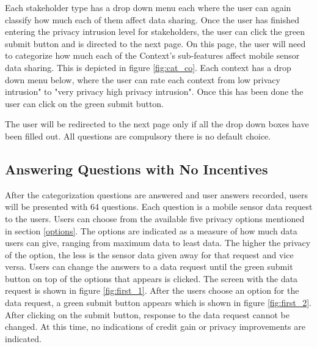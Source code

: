 Each stakeholder type has a drop
down menu each where the user can again classify how much each of them affect data sharing.
Once the user has finished entering the privacy intrusion level for stakeholders, the user can click the green submit button and is directed to the next page.
On this page, the user will need to categorize how much each of the Context's sub-features affect mobile sensor data sharing. This is depicted in figure \ref{fig:cat_co}. Each context has a drop down menu below, where the user can rate each context from low privacy intrusion" to "very privacy high privacy intrusion". Once this has been done the user can click on the green submit button.

The user will be redirected to the next page only if all the drop down boxes have been filled out. All questions are compulsory there is no default choice.

\subsection{Answering Questions with No Incentives}  \label{quest_wi}
After the categorization questions are answered and user answers recorded, users will be presented with 64 questions. Each question is a mobile sensor data request
to the users. Users can choose from the available five privacy options mentioned in section \ref{options}. The options are indicated as a measure of how much data users can give, ranging from maximum data to least data. The higher the privacy of the option, the less is the sensor data given away for that request and vice versa. Users can change the answers to a data request until the green submit button on top of the options that appears is clicked. The screen with the data request is shown in figure \ref{fig:first_1}. After the users choose an option for the data request, a green submit button appears which is shown in figure \ref{fig:first_2}. After clicking on the submit button, response to the data request cannot be changed. At this time, no indications of credit gain or privacy improvements are indicated.

